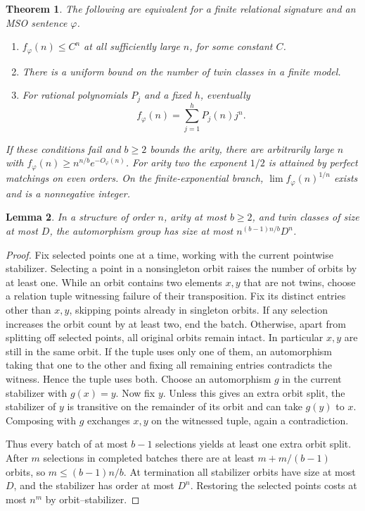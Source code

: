 \documentclass[11pt]{article}
\newtheorem{theorem}{Theorem}
\newtheorem{lemma}[theorem]{Lemma}
\begin{document}
\begin{theorem}\label{exp}
The following are equivalent for a finite relational signature and an MSO sentence $\varphi$.
\begin{enumerate}
\item $f_\varphi(n)\le C^n$ at all sufficiently large $n$, for some constant $C$.
\item There is a uniform bound on the number of twin classes in a finite model.
\item For rational polynomials $P_j$ and a fixed $h$, eventually
\[
                              f_\varphi(n)=\sum_{j=1}^h P_j(n)j^n .
\]
\end{enumerate}
If these conditions fail and $b\ge2$ bounds the arity, there are arbitrarily large $n$ with $f_\varphi(n)\ge n^{n/b}e^{-O_\varphi(n)}$. For arity two the exponent $1/2$ is attained by perfect matchings on even orders. On the finite-exponential branch, $\lim f_\varphi(n)^{1/n}$ exists and is a nonnegative integer.
\end{theorem}

\begin{lemma}\label{orbits}
In a structure of order $n$, arity at most $b\ge2$, and twin classes of size at most $D$, the automorphism group has size at most $n^{(b-1)n/b}D^n$.
\end{lemma}
\begin{proof}
Fix selected points one at a time, working with the current pointwise stabilizer. Selecting a point in a nonsingleton orbit raises the number of orbits by at least one. While an orbit contains two elements $x,y$ that are not twins, choose a relation tuple witnessing failure of their transposition. Fix its distinct entries other than $x,y$, skipping points already in singleton orbits. If any selection increases the orbit count by at least two, end the batch. Otherwise, apart from splitting off selected points, all original orbits remain intact. In particular $x,y$ are still in the same orbit. If the tuple uses only one of them, an automorphism taking that one to the other and fixing all remaining entries contradicts the witness. Hence the tuple uses both. Choose an automorphism $g$ in the current stabilizer with $g(x)=y$. Now fix $y$. Unless this gives an extra orbit split, the stabilizer of $y$ is transitive on the remainder of its orbit and can take $g(y)$ to $x$. Composing with $g$ exchanges $x,y$ on the witnessed tuple, again a contradiction.

Thus every batch of at most $b-1$ selections yields at least one extra orbit split. After $m$ selections in completed batches there are at least $m+m/(b-1)$ orbits, so $m\le (b-1)n/b$. At termination all stabilizer orbits have size at most $D$, and the stabilizer has order at most $D^n$. Restoring the selected points costs at most $n^m$ by orbit--stabilizer.
\end{proof}
\end{document}
